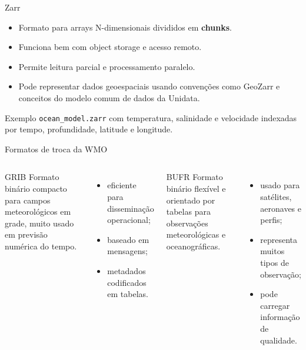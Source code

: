 \documentclass[aspectratio=169]{beamer}
\begin{document}
\begin{frame}{Zarr}
\begin{itemize}
  \item Formato para arrays N-dimensionais divididos em \textbf{chunks}.
  \item Funciona bem com object storage e acesso remoto.
  \item Permite leitura parcial e processamento paralelo.
  \item Pode representar dados geoespaciais usando convenções como GeoZarr e conceitos do modelo comum de dados da Unidata.
\end{itemize}

\vspace{0.4cm}

\begin{block}{Exemplo}
\texttt{ocean\_model.zarr} com temperatura, salinidade e velocidade indexadas por tempo, profundidade, latitude e longitude.
\end{block}
\end{frame}

\begin{frame}{Formatos de troca da WMO}
\begin{columns}
\begin{block}{GRIB}
Formato binário compacto para campos meteorológicos em grade, muito usado em previsão numérica do tempo.
\end{block}

\begin{itemize}
  \item eficiente para disseminação operacional;
  \item baseado em mensagens;
  \item metadados codificados em tabelas.
\end{itemize}

\begin{block}{BUFR}
Formato binário flexível e orientado por tabelas para observações meteorológicas e oceanográficas.
\end{block}

\begin{itemize}
  \item usado para satélites, aeronaves e perfis;
  \item representa muitos tipos de observação;
  \item pode carregar informação de qualidade.
\end{itemize}
\end{columns}
\end{frame}
\end{document}
